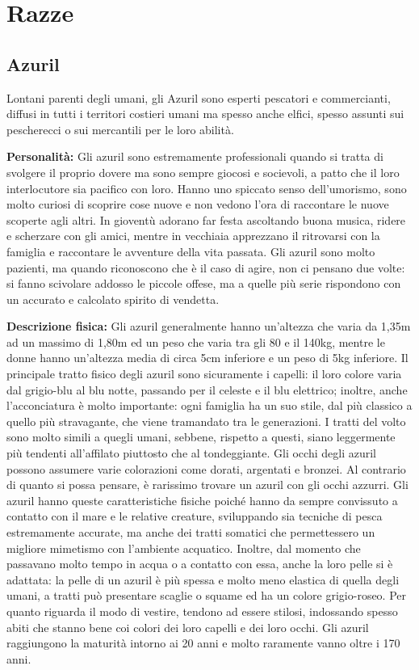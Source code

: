 \documentclass[10pt, a4paper]{report}
\begin{document}
\chapter{Razze}
\begin{multicols}{2}
\section{Azuril}
Lontani parenti degli umani, gli Azuril sono esperti pescatori e commercianti, diffusi in tutti i territori costieri umani ma spesso anche elfici, spesso assunti sui pescherecci o sui mercantili per le loro abilità.

\textbf{Personalità:} Gli azuril sono estremamente professionali quando si tratta di svolgere il proprio dovere ma sono sempre giocosi e socievoli, a patto che il loro interlocutore sia pacifico con loro. Hanno uno spiccato senso dell’umorismo, sono molto curiosi di scoprire cose nuove e non vedono l’ora di raccontare le nuove scoperte agli altri. In gioventù adorano far festa ascoltando buona musica, ridere e scherzare con gli amici, mentre in vecchiaia apprezzano il ritrovarsi con la famiglia e raccontare le avventure della vita passata. Gli azuril sono molto pazienti, ma quando riconoscono che è il caso di agire, non ci pensano due volte: si fanno scivolare addosso le piccole offese, ma a quelle più serie rispondono con un accurato e calcolato spirito di vendetta.

\textbf{Descrizione fisica:} Gli azuril generalmente hanno un’altezza che varia da 1,35m ad un massimo di 1,80m ed un peso che varia tra gli 80 e il 140kg, mentre le donne hanno un’altezza media di circa 5cm inferiore e un peso di 5kg inferiore. Il principale tratto fisico degli azuril sono sicuramente i capelli: il loro colore varia dal grigio-blu al blu notte, passando per il celeste e il blu elettrico; inoltre, anche l’acconciatura è molto importante: ogni famiglia ha un suo stile, dal più classico a quello più stravagante, che viene tramandato tra le generazioni. I tratti del volto sono molto simili a quegli umani, sebbene, rispetto a questi, siano leggermente più tendenti all’affilato piuttosto che al tondeggiante. Gli occhi degli azuril possono assumere varie colorazioni come dorati, argentati e bronzei. Al contrario di quanto si possa pensare, è rarissimo trovare un azuril con gli occhi azzurri. Gli azuril hanno queste caratteristiche fisiche poiché hanno da sempre convissuto a contatto con il mare e le relative creature, sviluppando sia tecniche di pesca estremamente accurate, ma anche dei tratti somatici che permettessero un migliore mimetismo con l’ambiente acquatico. Inoltre, dal momento che passavano molto tempo in acqua o a contatto con essa, anche la loro pelle si è adattata: la pelle di un azuril è più spessa e molto meno elastica di quella degli umani, a tratti può presentare scaglie o squame ed ha un colore grigio-roseo.  Per quanto riguarda il modo di vestire, tendono ad essere stilosi, indossando spesso abiti che stanno bene coi colori dei loro capelli e dei loro occhi. Gli azuril raggiungono la maturità intorno ai 20 anni e molto raramente vanno oltre i 170 anni.



\end{multicols}
\end{document}
